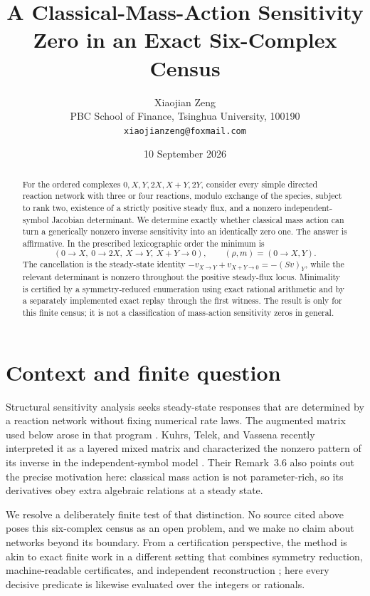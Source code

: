 \documentclass[11pt]{article}
\title{A Classical-Mass-Action Sensitivity Zero in an Exact Six-Complex Census}
\author{Xiaojian Zeng\\
  \small PBC School of Finance, Tsinghua University, 100190\\
  \small \texttt{xiaojianzeng@foxmail.com}}
\date{10 September 2026}
\begin{document}
\maketitle

\begin{abstract}
For the ordered complexes
\(0,X,Y,2X,X+Y,2Y\), consider every simple directed reaction network
with three or four reactions, modulo exchange of the species, subject to
rank two, existence of a strictly positive steady flux, and a nonzero
independent-symbol Jacobian determinant.  We determine exactly whether
classical mass action can turn a generically nonzero inverse sensitivity
into an identically zero one.  The answer is affirmative.  In the prescribed
lexicographic order the minimum is
\[
  (0\to X,\ 0\to2X,\ X\to Y,\ X+Y\to0),
  \qquad (\rho,m)=(0\to X,Y).
\]
The cancellation is the steady-state identity
\(-v_{X\to Y}+v_{X+Y\to0}=-(Sv)_Y\), while the relevant determinant is
nonzero throughout the positive steady-flux locus.  Minimality is certified
by a symmetry-reduced enumeration using exact rational arithmetic and by a
separately implemented exact replay through the first witness.  The result is
only for this finite census; it is not a classification of mass-action
sensitivity zeros in general.
\end{abstract}

\section{Context and finite question}

Structural sensitivity analysis seeks steady-state responses that are
determined by a reaction network without fixing numerical rate laws.  The
augmented matrix used below arose in that program
\cite{mochizuki-fiedler-2015,brehm-fiedler-2018}.  Kuhrs, Telek, and Vassena
recently interpreted it as a layered mixed matrix and characterized the
nonzero pattern of its inverse in the independent-symbol model
\cite{kuhrs-telek-vassena-2026}.  Their Remark~3.6 also points out the precise
motivation here: classical mass action is not parameter-rich, so its
derivatives obey extra algebraic relations at a steady state.

We resolve a deliberately finite test of that distinction.  No source cited
above poses this six-complex census as an open problem, and we make no claim
about networks beyond its boundary.  From a certification perspective, the
method is akin to exact finite work in a different setting that combines
symmetry reduction, machine-readable certificates, and independent
reconstruction \cite{zeng-liu-ratnavelu-ong-2026}; here every decisive
predicate is likewise evaluated over the integers or rationals.
\end{document}
